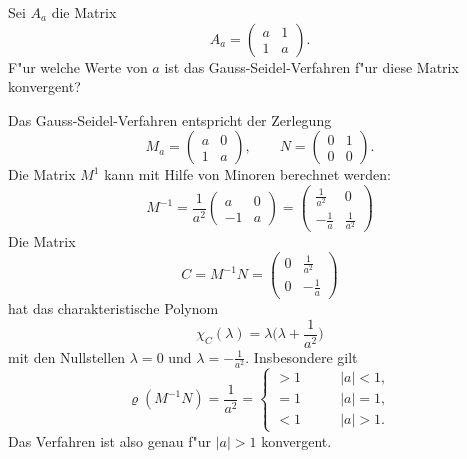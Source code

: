 Sei $A_a$ die Matrix
\[
A_a=\begin{pmatrix}a&1\\1&a\end{pmatrix}.
\]
F"ur welche Werte von $a$ ist das Gauss-Seidel-Verfahren f"ur diese Matrix
konvergent?

\begin{loesung}
Das Gauss-Seidel-Verfahren entspricht der Zerlegung
\[
M_a=\begin{pmatrix}a&0\\1&a\end{pmatrix},\qquad
N=\begin{pmatrix}0&1\\0&0\end{pmatrix}.
\]
Die Matrix $M^{1}$ kann mit Hilfe von Minoren berechnet werden:
\[
M^{-1}=\frac1{a^2}\begin{pmatrix}
a&0\\
-1&a
\end{pmatrix}
=
\begin{pmatrix}
\frac1{a^2}&0\\
-\frac1a&\frac1{a^2}
\end{pmatrix}
\]
Die Matrix
\[
C=M^{-1}N=\begin{pmatrix}
0&\frac1{a^2}\\
0&-\frac1a
\end{pmatrix}
\]
hat das charakteristische Polynom 
\[
\chi_C(\lambda)=\lambda\biggl(\lambda+\frac1{a^2}\biggr)
\]
mit den Nullstellen $\lambda=0$ und $\lambda=-\frac1{a^2}$. Insbesondere gilt
\[
\varrho(M^{-1}N)=\frac1{a^2}=\begin{cases}
>1\qquad &|a| < 1,\\
=1\qquad &|a|=1,\\
<1\qquad &|a| > 1.
\end{cases}
\]
Das Verfahren ist also genau f"ur $|a|>1$ konvergent.
\end{loesung}

